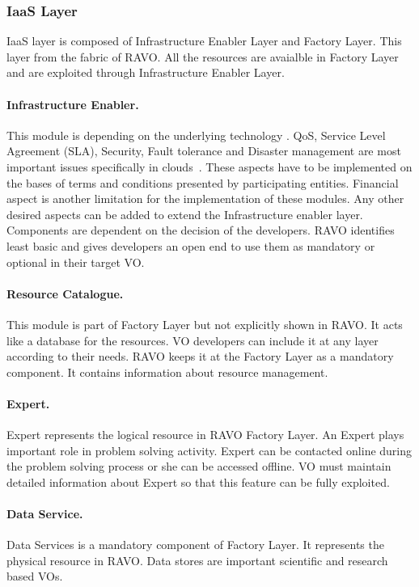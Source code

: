 \documentclass[]{article}
\begin{document}
\subsubsection{IaaS Layer}
IaaS layer is composed of Infrastructure Enabler Layer and Factory Layer. This layer from the fabric of RAVO. All the resources are avaialble in Factory Layer and are exploited through Infrastructure Enabler Layer.
\paragraph{Infrastructure Enabler.}
This module is depending on the underlying technology . QoS, Service Level Agreement (SLA), Security, Fault tolerance and Disaster management are  most important issues specifically in clouds~\cite{haq_sla_2010,haq_aggregation_2010,haq_sla_2010-1,haq_conceptual_2009,haq_rule-based_2009,haq_aggregating_2009}. These aspects have  to be implemented on the bases of terms and conditions presented by participating entities. Financial aspect is another limitation for the implementation of these modules. Any other desired aspects can be added to extend the Infrastructure enabler layer. Components are dependent on the decision of the developers. RAVO identifies least basic and gives developers an open end to use them as mandatory or optional in their target VO.

\paragraph{Resource Catalogue.}
This module is part of Factory Layer but not explicitly shown in RAVO. It acts like a database for the resources. VO developers can include it at any layer according to their needs. RAVO keeps it at the Factory Layer as a  mandatory component. It contains information about resource management.

\paragraph{Expert.}
Expert represents the logical resource in RAVO Factory Layer. An Expert plays important role in problem solving activity. Expert can be contacted online during the problem solving process or she can be accessed offline. VO must maintain detailed information about Expert so that this feature can be fully exploited.

\paragraph{Data Service.}
Data Services is a mandatory component of Factory Layer. It represents the physical resource in RAVO. Data stores are important scientific and research based VOs.
\end{document}
